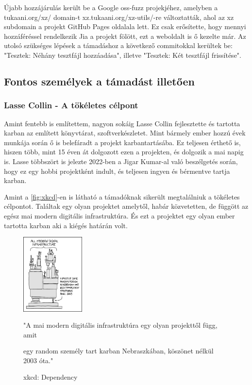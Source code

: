 \documentclass[11pt]{article}
\begin{document}
Újabb hozzájárulás került be a Google oss-fuzz projekjéhez, amelyben a tukaani.org/xz/ domain-t xz.tukaani.org/xz-utils/-re változtatták, ahol az xz subdomain a projekt GitHub Pages oldalala lett. Ez csak erősítette, hogy mennyi hozzáféréssel rendelkezik Jia a projekt fölött, ezt a weboldalt is ő kezelte már.
Az utolsó szükséges lépések a támadáshoz a következő commitokkal kerültek be: "Tesztek: Néhány tesztfájl hozzáadása", illetve "Tesztek: Két tesztfájl frissítése".

\subsection{Fontos személyek a támadást illetően}

\subsubsection{Lasse Collin - A tökéletes célpont}

Amint fentebb is említettem, nagyon sokáig Lasse Collin fejlesztette és tartotta karban az említett könyvtárat, szoftverkészletet. Mint bármely ember hozzú évek munkája során ő is belefáradt a projekt karbantartásába. Ez teljesen érthető is, hiszen több, mint 15 éven át dolgozott ezen a projekten, és dolgozik a mai napig is. 
Lasse többszört is jelezte 2022-ben a Jigar Kumar-al való beszélgetés során, hogy ez egy hobbi projektként indult, és teljesen ingyen és bérmentve tartja karban.

Amint a \autoref{fig:xkcd}-en is látható a támadóknak sikerült megtalálniuk a tökéletes célpontot. Találtak egy olyan projektet amelytől, habár közvetetten, de függött az egész mai modern digitális infrastruktúra. És ezt a projektet egy olyan ember tartotta karban aki a kiégés határán volt.

\begin{figure}[H]
    \centering
    \includegraphics[width=0.285\textwidth]{assets/dependency.png}
    \caption{xkcd: Dependency}
    \medskip
    \small
    "A mai modern digitális infrastruktúra egy olyan projekttől függ, amit 
    
    egy random személy tart karban Nebraszkában, köszönet nélkül 2003 óta."
    \label{fig:xkcd}
    \cite{xkcd}
    \FloatBarrier
\end{figure}
\end{document}
